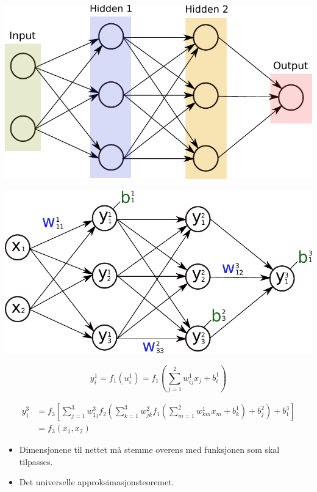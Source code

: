 \documentclass{beamer}
\begin{document}
\begin{frame}
 
\centering
\includegraphics[width=0.9\linewidth]{../Figures/Theory/networkGeneralAltered.pdf}

\end{frame}


\begin{frame}
 
\centering
\includegraphics[width=0.8\linewidth]{../Figures/Theory/networkWithNotationAltered.pdf}

\begin{equation*}
 y_i^1 = f_1(u_i^1) = f_1\left(\sum_{j=1}^2 w_{ij}^1 x_j  + b_i^1\right)
\end{equation*}

\end{frame}


\begin{frame}

\begin{align*}
  y_1^3 &= f_3\left[\sum_{j=1}^3 w_{1j}^3 f_2\left(\sum_{k=1}^3 w_{jk}^2 f_1\left(\sum_{m=1}^2 w_{km}^1 x_m + b_k^1\right) + b_j^2\right)
  + b_1^3\right] \\
  &= f_3(x_1, x_2)
\end{align*}
\begin{itemize}
 \item Dimensjonene til nettet må stemme overens med funksjonen som skal tilpasses. 
 \item Det universelle approksimasjonsteoremet. 
\end{itemize}


\end{frame}
\end{document}
